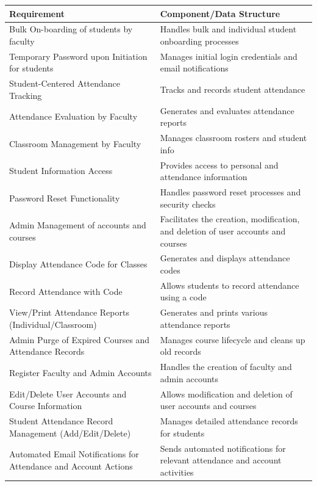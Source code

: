\documentclass[letterpaper,12pt,oneside,listof=totoc]{scrreprt}
\begin{document}
\begin{longtable}{| p{} | p{} |}
\hline
\textbf{Requirement} & \textbf{Component/Data Structure} \\
\hline
\endhead %
Bulk On-boarding of students by faculty & Handles bulk and individual student onboarding processes \\
\hline
Temporary Password upon Initiation for students & Manages initial login credentials and email notifications \\
\hline
Student-Centered Attendance Tracking & Tracks and records student attendance \\
\hline
Attendance Evaluation by Faculty & Generates and evaluates attendance reports \\
\hline
Classroom Management by Faculty & Manages classroom rosters and student info \\
\hline
Student Information Access & Provides access to personal and attendance information \\
\hline
Password Reset Functionality & Handles password reset processes and security checks \\
\hline
Admin Management of accounts and courses & Facilitates the creation, modification, and deletion of user accounts and courses \\
\hline
Display Attendance Code for Classes & Generates and displays attendance codes \\
\hline
Record Attendance with Code & Allows students to record attendance using a code \\
\hline
View/Print Attendance Reports (Individual/Classroom) & Generates and prints various attendance reports \\
\hline
Admin Purge of Expired Courses and Attendance Records & Manages course lifecycle and cleans up old records \\
\hline
Register Faculty and Admin Accounts & Handles the creation of faculty and admin accounts \\
\hline
Edit/Delete User Accounts and Course Information & Allows modification and deletion of user accounts and courses \\
\hline
Student Attendance Record Management (Add/Edit/Delete) & Manages detailed attendance records for students \\
\hline
Automated Email Notifications for Attendance and Account Actions & Sends automated notifications for relevant attendance and account activities \\
\hline
\end{longtable}
\end{document}
